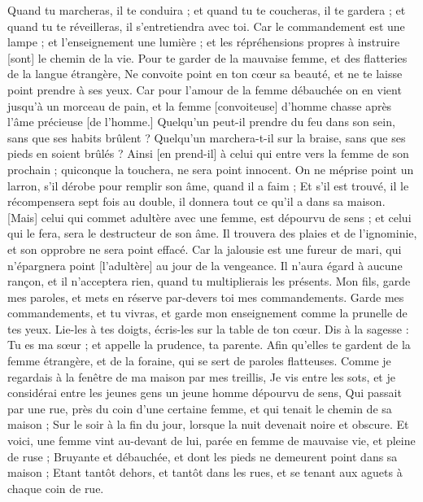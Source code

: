 \begin{multicols}{2}
Quand tu marcheras, il te conduira ; et quand tu te coucheras, il te gardera ; et quand tu te réveilleras, il s'entretiendra avec toi.
Car le commandement est une lampe ; et l'enseignement une lumière ; et les répréhensions propres à instruire [sont] le chemin de la vie.
Pour te garder de la mauvaise femme, et des flatteries de la langue étrangère,
Ne convoite point en ton cœur sa beauté, et ne te laisse point prendre à ses yeux.
Car pour l'amour de la femme débauchée on en vient jusqu'à un morceau de pain, et la femme [convoiteuse] d'homme chasse après l'âme précieuse [de l'homme.]
Quelqu'un peut-il prendre du feu dans son sein, sans que ses habits brûlent ?
Quelqu'un marchera-t-il sur la braise, sans que ses pieds en soient brûlés ?
Ainsi [en prend-il] à celui qui entre vers la femme de son prochain ; quiconque la touchera, ne sera point innocent.
On ne méprise point un larron, s'il dérobe pour remplir son âme, quand il a faim ;
Et s'il est trouvé, il le récompensera sept fois au double, il donnera tout ce qu'il a dans sa maison.
[Mais] celui qui commet adultère avec une femme, est dépourvu de sens ; et celui qui le fera, sera le destructeur de son âme.
Il trouvera des plaies et de l'ignominie, et son opprobre ne sera point effacé.
Car la jalousie est une fureur de mari, qui n'épargnera point [l'adultère] au jour de la vengeance.
Il n'aura égard à aucune rançon, et il n'acceptera rien, quand tu multiplierais les présents.
\VerseOne{}Mon fils, garde mes paroles, et mets en réserve par-devers toi mes commandements.
Garde mes commandements, et tu vivras, et garde mon enseignement comme la prunelle de tes yeux.
Lie-les à tes doigts, écris-les sur la table de ton cœur.
Dis à la sagesse : Tu es ma sœur ; et appelle la prudence, ta parente.
Afin qu'elles te gardent de la femme étrangère, et de la foraine, qui se sert de paroles flatteuses.
Comme je regardais à la fenêtre de ma maison par mes treillis,
Je vis entre les sots, et je considérai entre les jeunes gens un jeune homme dépourvu de sens,
Qui passait par une rue, près du coin d'une certaine femme, et qui tenait le chemin de sa maison ;
Sur le soir à la fin du jour, lorsque la nuit devenait noire et obscure.
Et voici, une femme vint au-devant de lui, parée en femme de mauvaise vie, et pleine de ruse ;
Bruyante et débauchée, et dont les pieds ne demeurent point dans sa maison ;
Etant tantôt dehors, et tantôt dans les rues, et se tenant aux aguets à chaque coin de rue.

\end{multicols}
